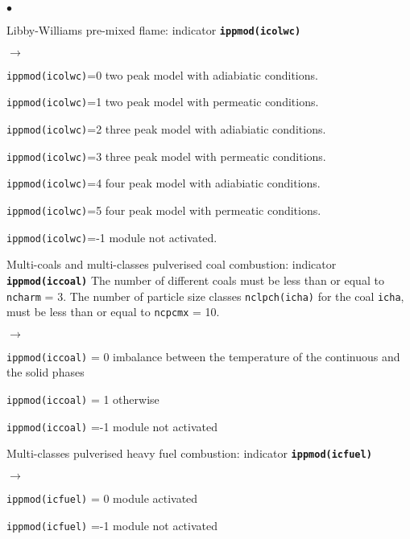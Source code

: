 {{{\begin{list}{$\bullet$}{}
        \item Libby-Williams pre-mixed flame: indicator {\bf \tt ippmod(icolwc)}
         \begin{list}{$\rightarrow$}{}
               \item \texttt{ippmod(icolwc)}=0 two peak model with adiabiatic conditions.
               \item \texttt{ippmod(icolwc)}=1 two peak model with permeatic conditions.
               \item \texttt{ippmod(icolwc)}=2 three peak model with adiabiatic conditions.
               \item \texttt{ippmod(icolwc)}=3 three peak model with permeatic conditions.
               \item \texttt{ippmod(icolwc)}=4 four peak model with adiabiatic conditions.
               \item \texttt{ippmod(icolwc)}=5 four peak model with permeatic conditions.
               \item \texttt{ippmod(icolwc)}=-1 module not activated.
          \end{list}
        \item Multi-coals and multi-classes pulverised coal combustion:
              indicator {\bf \tt ippmod(iccoal)}
              The number of different coals must be less than or equal to
              \texttt{ncharm} = 3. The number of particle size
             classes \texttt{nclpch(icha)} for the coal
             \texttt{icha}, must
             be less than or equal to \texttt{ncpcmx} = 10.
         \begin{list}{$\rightarrow$}{}
                \item \texttt{ippmod(iccoal)} = 0 imbalance between the
                      temperature of the continuous and the solid phases
                \item \texttt{ippmod(iccoal)} = 1 otherwise
                \item \texttt{ippmod(iccoal)} =-1 module not activated
         \end{list}

        \item Multi-classes pulverised heavy fuel combustion:
              indicator {\bf \tt ippmod(icfuel)}
         \begin{list}{$\rightarrow$}{}
                \item \texttt{ippmod(icfuel)} = 0 module activated
                \item \texttt{ippmod(icfuel)} =-1 module not activated
         \end{list}


\end{list}}}}
